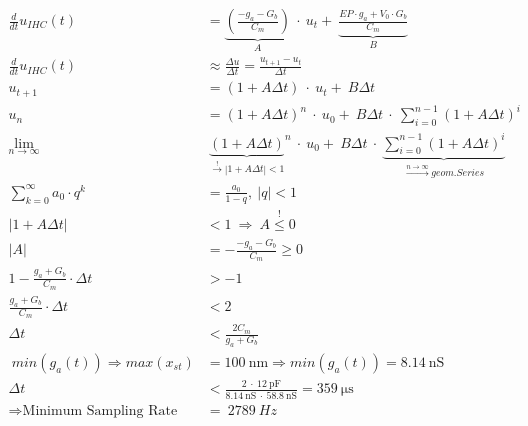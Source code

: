 \begin{align}
    \frac{d}{dt} u_{IHC}(t) &=  \underbrace{\left(\frac{- g_a - G_b}{C_m}\right)}_{\text{$\mathit{A}$}} \ \cdot\ u_t +\ \underbrace{\frac{EP\cdot g_a + V_0\cdot G_b}{C_m}}_{\text{$\mathit{B}$}} \\
     \frac{d}{dt} u_{IHC}(t) &\approx \frac{\Delta u}{\Delta t} = \frac{u_{t+1}-u_t}{\Delta t}\\
    u_{t+1} &=  \left(1+\mathit{A} \Delta t \right)\ \cdot\ u_t +\ \mathit{B} \Delta t\\
    u_n &= \left(1+\mathit{A} \Delta t \right)^n\ \cdot\ u_0 +\ \mathit{B} \Delta t\ \cdot\ \sum_{i=0}^{n-1}{\left(1+\mathit{A} \Delta t \right)^i}\\
    \lim\limits_{n \to \infty}&\ {\underbrace{\left(1+\mathit{A} \Delta t \right)}_{\text{$\xrightarrow{\text{!}}|1+\mathit{A}\Delta t|<1$}}}^n \ \cdot\ u_0 +\ \mathit{B} \Delta t\ \cdot\ \underbrace{\sum_{i=0}^{n-1}{\left(1+\mathit{A} \Delta t \right)^i}}_{\text{$\xrightarrow{n\xrightarrow{}\infty}geom. Series$}}\\
    \sum_{k=0}^{\infty}{a_0\cdot q^k} &= \frac{a_0}{1-q},\ |q|<1\\
    |1+\mathit{A}\Delta t|\ &< 1\  \Rightarrow \ A \overset{\text{!}}{\leq} 0\\
    |A| &= -\frac{- g_a - G_b}{C_m} \geq 0\\
    1-\frac{ g_a+ G_b}{C_m}\cdot\Delta t &> -1\\
    \frac{ g_a + G_b}{C_m} \cdot\Delta t &< 2\\
    \Delta t &< \frac{2C_m}{g_a+G_b}\\\
    min(g_a(t)) \Rightarrow max(x_{st}) &=\SI{100}{\nano \meter} \Rightarrow min(g_a(t)) = \SI{8.14}{\nano \siemens}\\
    \Delta t &< \frac{2\ \cdot\ \SI{12}{\pico \farad}}{\SI{8.14}{\nano \siemens}\ \cdot\ \SI{58.8}{\nano \siemens}} =  \SI{359}{\micro \second}\\
    \Rightarrow \text{Minimum Sampling Rate}\ &=\ \SI{2789}{Hz}
    \end{align}